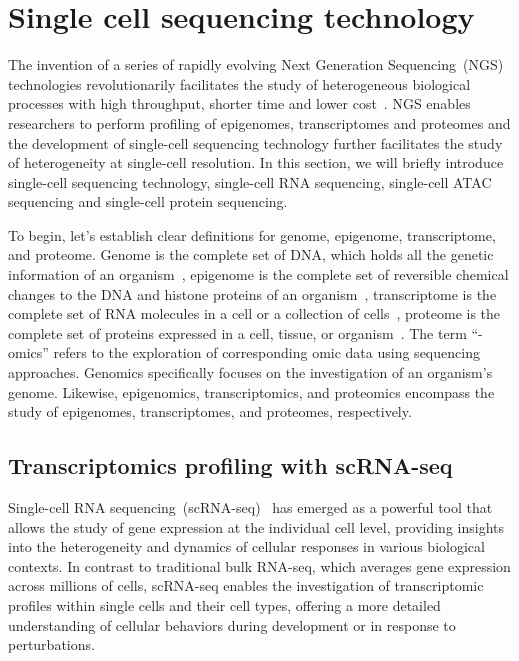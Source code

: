 \section{Single cell sequencing technology}
\label{background:profiling_singlecell}
The invention of a series of rapidly evolving Next Generation Sequencing~(NGS) technologies revolutionarily facilitates the study of heterogeneous biological processes with high throughput, shorter time and lower cost~\citep{svensson2018exponential}. NGS enables researchers to perform profiling of epigenomes, transcriptomes and proteomes and the development of single-cell sequencing technology further facilitates the study of heterogeneity at single-cell resolution. In this section, we will briefly introduce single-cell sequencing technology, single-cell RNA sequencing, single-cell ATAC sequencing and single-cell protein sequencing.

To begin, let's establish clear definitions for genome, epigenome, transcriptome, and proteome. Genome is the complete set of DNA, which holds all the genetic information of an organism~\citep{hubbard2002genome}, epigenome is the complete set of reversible chemical changes to the DNA and histone proteins of an organism~\citep{bernstein2007epigenome}, transcriptome is the complete set of RNA molecules in a cell or a collection of cells~\citep{haoudi2006proteome}, proteome is the complete set of proteins expressed in a cell, tissue, or organism~\citep{wang2009transcriptome}. The term “-omics” refers to the exploration of corresponding omic data using sequencing approaches. Genomics specifically focuses on the investigation of an organism's genome. Likewise, epigenomics, transcriptomics, and proteomics encompass the study of epigenomes, transcriptomes, and proteomes, respectively.


\subsection{Transcriptomics profiling with scRNA-seq}
\label{background:sec1:scRNA}

Single-cell RNA sequencing~(scRNA-seq)~\citep{singlecellsequencing2014, singlecellsequencing2015} has emerged as a powerful tool that allows the study of gene expression at the individual cell level, providing insights into the heterogeneity and dynamics of cellular responses in various biological contexts. In contrast to traditional bulk RNA-seq, which averages gene expression across millions of cells, scRNA-seq enables the investigation of transcriptomic profiles within single cells and their cell types, offering a more detailed understanding of cellular behaviors during development or in response to perturbations.


